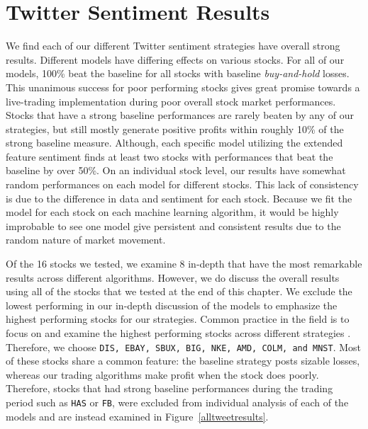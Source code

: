 \documentclass[../thesis.tex]{subfiles}
\begin{document}
\chapter{Twitter Sentiment Results}
\label{ch:sentimentresults}

We find each of our different Twitter sentiment strategies have overall strong results. Different models have differing effects on various stocks. For all of our models, 100\% beat the baseline for all stocks with baseline \textit{buy-and-hold} losses. This unanimous success for poor performing stocks gives great promise towards a live-trading implementation during poor overall stock market performances. Stocks that have a strong baseline performances are rarely beaten by any of our strategies, but still mostly generate positive profits within roughly 10\% of the strong baseline measure. Although, each specific model utilizing the extended feature sentiment finds at least two stocks with performances that beat the baseline by over 50\%. On an individual stock level, our results have somewhat random performances on each model for different stocks. This lack of consistency is due to the difference in data and sentiment for each stock. Because we fit the model for each stock on each machine learning algorithm, it would be highly improbable to see one model give persistent and consistent results due to the random nature of market movement. 

Of the 16 stocks we tested, we examine 8 in-depth that have the most remarkable results across different algorithms. However, we do discuss the overall results using all of the stocks that we tested at the end of this chapter. We exclude the lowest performing in our in-depth discussion of the models to emphasize the highest performing stocks for our strategies. Common practice in the field is to focus on and examine the highest performing stocks across different strategies \cite{Aldridge2010}. Therefore, we choose \texttt{DIS, EBAY, SBUX, BIG, NKE, AMD, COLM, and MNST}. Most of these stocks share a common feature: the baseline strategy posts sizable losses, whereas our trading algorithms make profit when the stock does poorly. Therefore, stocks that had strong baseline performances during the trading period such as \texttt{HAS} or \texttt{FB}, were excluded from individual analysis of each of the models and are instead examined in Figure~\ref{alltweetresults}. 
\end{document}

